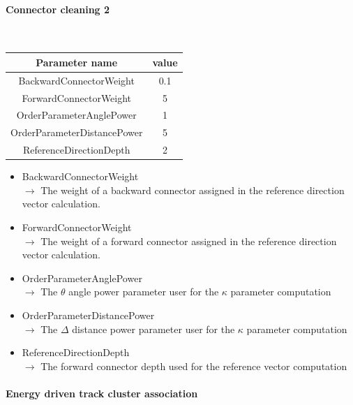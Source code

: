 \documentclass[cits]{JINST}
\begin{document}
\newpage
\paragraph{Connector cleaning 2} ~

\begin{table}[!ht]
  \begin{center}
    \begin{tabu} to \linewidth { c | c } 
          Parameter name & value \\
          \hline
          BackwardConnectorWeight & 0.1 \\
          ForwardConnectorWeight & 5 \\
          OrderParameterAnglePower & 1 \\
          OrderParameterDistancePower & 5 \\
          ReferenceDirectionDepth & 2
    \end{tabu} 
  \end{center}
\end{table}

\begin{itemize}
  \item BackwardConnectorWeight \\
  $\rightarrow$ The weight of a backward connector assigned in the reference direction vector calculation.
  \item ForwardConnectorWeight \\
  $\rightarrow$ The weight of a forward connector assigned in the reference direction vector calculation.
  \item OrderParameterAnglePower \\
  $\rightarrow$ The $\theta$ angle power parameter user for the $\kappa$ parameter computation
  \item OrderParameterDistancePower \\
  $\rightarrow$ The $\Delta$ distance power parameter user for the $\kappa$ parameter computation
  \item ReferenceDirectionDepth \\
  $\rightarrow$ The forward connector depth used for the reference vector computation
\end{itemize}


\paragraph{Energy driven track cluster association} ~
\end{document}
